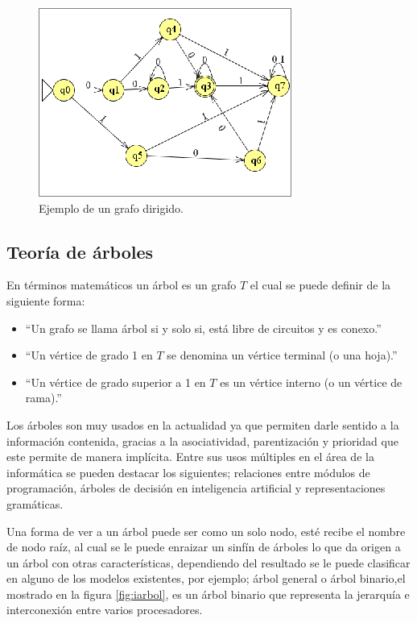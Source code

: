 \begin{figure}[h]
\centering
\includegraphics[width=0.8\columnwidth]{chap3/Imagenes/GrafoDirigido.eps}
\caption{Ejemplo de un grafo dirigido.}
\label{fig:igrafoD}
\end{figure}


\subsection{Teor\'ia de \'arboles}
En t\'erminos matem\'aticos un \'arbol es un grafo $T$ el cual se puede definir de
 la siguiente forma\cite{SUSANNAS.EPP2012}:

\begin{itemize}
	\item ``Un grafo se llama \'arbol si y solo si, est\'a libre de circuitos y
	 es conexo.''
	\item ``Un v\'ertice de grado 1 en $T$ se denomina un v\'ertice terminal (o
	 una hoja).''
	\item ``Un v\'ertice de grado superior a 1 en $T$ es un v\'ertice interno (o
	 un v\'ertice de rama).''
\end{itemize}


Los \'arboles son muy usados en la actualidad ya que permiten  darle sentido a
 la informaci\'on contenida, gracias a la asociatividad, parentizaci\'on y
 prioridad que este permite de manera impl\'icita. Entre sus usos m\'ultiples en
 el \'area de la inform\'atica se pueden destacar los  siguientes; relaciones
 entre m\'odulos de programaci\'on, \'arboles de decisi\'on en inteligencia artificial
 y representaciones gram\'aticas\cite{gutierrez1999estructuras}.  

Una forma de ver a un \'arbol puede ser como un solo nodo, est\'e recibe el nombre
 de  nodo ra\'iz, al cual se le puede enraizar un sinf\'in de \'arboles lo que da
 origen  a un \'arbol con otras caracter\'isticas, dependiendo del resultado se le
 puede clasificar en alguno de los modelos existentes, por ejemplo; \'arbol 
 general o \'arbol binario\cite{gutierrez1999estructuras},el mostrado en la figura
 \ref{fig:iarbol}, es un \'arbol binario que representa la jerarqu\'ia e 
 interconexi\'on entre varios procesadores. 

